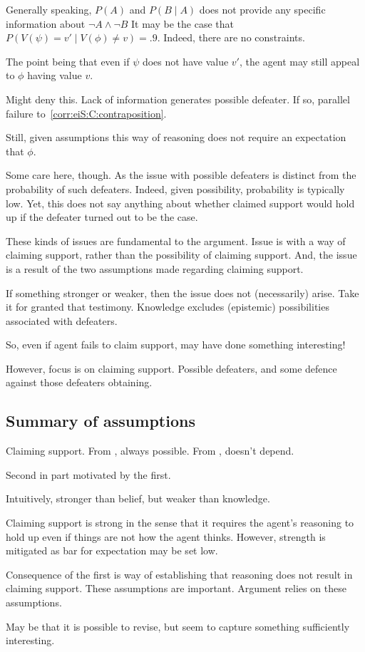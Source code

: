 \begin{note}
  Generally speaking, \(P(A)\) and \(P(B \mid A)\) does not provide any specific information about \(\lnot A \land \lnot B\)
  It may be the case that \(P(V(\psi) = v' \mid V(\phi) \ne v) = .9\).
  Indeed, there are no constraints.

  The point being that even if \(\psi\) does not have value \(v'\), the agent may still appeal to \(\phi\) having value \(v\).

  Might deny this.
  Lack of information generates possible defeater.
  If so, parallel failure to~\autoref{corr:eiS:C:contraposition}.

  Still, given assumptions this way of reasoning does not require an expectation that \(\phi\).

  {
    \color{red}
    Some care here, though.
    As the issue with possible defeaters is distinct from the probability of such defeaters.
    Indeed, given possibility, probability is typically low.
    Yet, this does not say anything about whether claimed support would hold up if the defeater turned out to be the case.
  }
\end{note}

\begin{note}
  These kinds of issues are fundamental to the argument.
  Issue is with a way of claiming support, rather than the possibility of claiming support.
  And, the issue is a result of the two assumptions made regarding claiming support.

  If something stronger or weaker, then the issue does not (necessarily) arise.
  Take it for granted that testimony.
  Knowledge excludes (epistemic) possibilities associated with defeaters.

  So, even if agent fails to claim support, may have done something interesting!

  However, focus is on claiming support.
  Possible defeaters, and some defence against those defeaters obtaining.
\end{note}

\subsection{Summary of assumptions}

\begin{note}
  Claiming support.
  From \nfcs{}, always possible.
  From \eiS{}, doesn't depend.

  Second in part motivated by the first.

  Intuitively, stronger than belief, but weaker than knowledge.

  {
    \color{red}
    Claiming support is strong in the sense that it requires the agent's reasoning to hold up even if things are not how the agent thinks.
    However, strength is mitigated as bar for expectation may be set low.
  }

  Consequence of the first is way of establishing that reasoning does not result in claiming support.
  These assumptions are important.
  Argument relies on these assumptions.

  May be that it is possible to revise, but seem to capture something sufficiently interesting.
\end{note}

